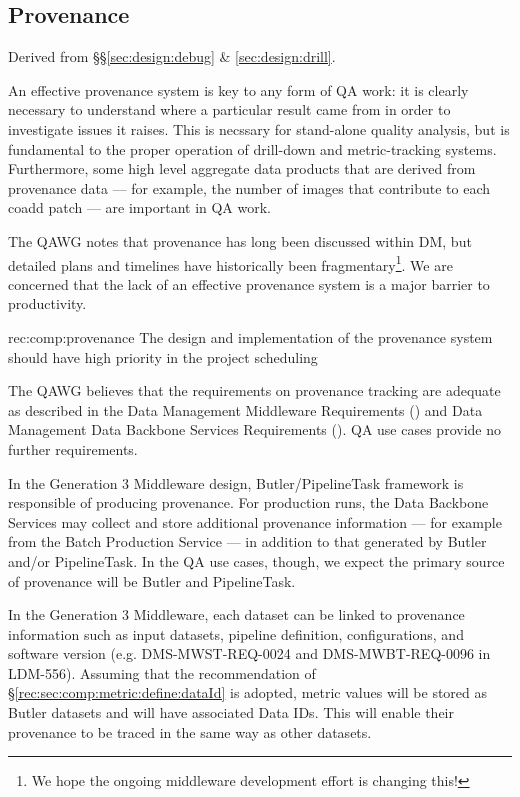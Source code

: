 \subsection{Provenance}
\label{sec:comp:provenance}

Derived from \S\S\ref{sec:design:debug} \& \ref{sec:design:drill}.

An effective provenance system is key to any form of QA work: it is clearly necessary to understand where a particular result came from in order to investigate issues it raises.
This is necssary for stand-alone quality analysis, but is fundamental to the proper operation of drill-down and metric-tracking systems.
Furthermore, some high level aggregate data products that are derived from provenance data --- for example, the number of images that contribute to each coadd patch --- are important in QA work.

The QAWG notes that provenance has long been discussed within DM, but detailed plans and timelines have historically been fragmentary\footnote{We hope the ongoing middleware development effort is changing this!}.
We are concerned that the lack of an effective provenance system is a major barrier to productivity.

\begin{recommendation}
  {rec:comp:provenance}
  {The design and implementation of the provenance system should have high priority in the project scheduling}
\end{recommendation}

The QAWG believes that the requirements on provenance tracking are adequate as described in the Data Management Middleware Requirements () and Data Management Data Backbone Services Requirements ().
QA use cases provide no further requirements.

In the Generation 3 Middleware design, Butler/PipelineTask framework is responsible of producing provenance.
For production runs, the Data Backbone Services may collect and store additional provenance information --- for example from the Batch Production Service --- in addition to that generated by Butler and/or PipelineTask.
In the QA use cases, though, we expect the primary source of provenance will be Butler and PipelineTask.

In the Generation 3 Middleware, each dataset can be linked to provenance information such as input datasets, pipeline definition, configurations, and software version (e.g. DMS-MWST-REQ-0024 and DMS-MWBT-REQ-0096 in LDM-556).
Assuming that the recommendation of \S\ref{rec:sec:comp:metric:define:dataId} is adopted, \glspl{metric value} will be stored as Butler datasets and will have associated Data IDs.
This will enable their provenance to be traced in the same way as other datasets.

